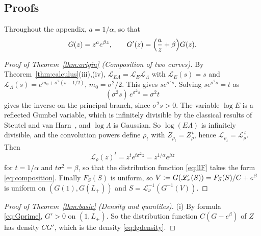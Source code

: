 \documentclass[sn-mathphys-num]{sn-jnl}\newcommand{\SNJNL}{}
\theoremstyle{thmstyleone}
\theoremstyle{thmstyletwo}
\theoremstyle{thmstylethree}
\theoremstyle{thmstyleone}
\providecommand{\Leh}{\mathscr{L}}
\providecommand{\eqdef}{\mathrel{\vcentcolon=}}
\begin{document}
	\clearpage
	\begin{appendices}
		\section{Proofs}\label{app:proofs}
		
		Throughout the appendix,
		$a=1/\alpha$, so that
		\begin{equation}\label{eq:Gprime}
			G(z)=z^{a}e^{\beta z},
			\qquad
			G'(z)=\Bigl(\frac az+\beta\Bigr)G(z).
		\end{equation}
		
		\begin{proof}[Proof of Theorem~\ref{thm:origin} (Composition of two curves)]
			By Theorem~\ref{thm:calculus}(iii),(iv),
			$\Leh_{E\Lambda}=\Leh_E\Leh_\Lambda$ with $\Leh_E(s)=s$ and
			$\Leh_\Lambda(s)=e^{m_0+\sigma^{2}(s-1/2)}$, $m_0=\sigma^{2}/2$.
			This gives $se^{\sigma^{2}s}$. Solving $se^{\sigma^{2}s}=t$ as
			\begin{equation}\label{eq:lambertsolve}
				(\sigma^{2}s)\,e^{\sigma^{2}s}=\sigma^{2}t
			\end{equation}
			gives the inverse on the principal branch, since $\sigma^{2}s>0$.
			The variable $\log E$ is a reflected Gumbel variable, which is
			infinitely divisible by the classical results of Steutel and van
			Harn~\cite{steutel2004}, and $\log\Lambda$ is
			Gaussian. So $\log(E\Lambda)$ is infinitely divisible, and the
			convolution powers define $\rho_t$ with $Z_{\rho_t}=Z_\rho^{\,t}$,
			hence $\Leh_{\rho_t}=\Leh_\rho^{\,t}$. Then
			\begin{equation}\label{eq:Gpower}
				\Leh_\rho(z)^{t}=z^{t}e^{t\sigma^{2}z}=z^{1/\alpha}e^{\beta z}
			\end{equation}
			for $t=1/\alpha$ and $t\sigma^{2}=\beta$, so that the distribution
			function \eqref{eq:llF} takes the form \eqref{eq:composition}. Finally $F_S(S)$ is uniform, so
			$V\eqdef G(\Leh_\nu(S))=F_S(S)/C+e^{\beta}$ is uniform on
			$(G(1),G(L_+))$ and $S=\Leh_\nu^{-1}(G^{-1}(V))$.
		\end{proof}
		
		\begin{proof}[Proof of Theorem~\ref{thm:basic} (Density and quantiles)]\leavevmode
			
			\noindent(i) By formula \eqref{eq:Gprime}, $G'>0$ on $(1,L_+)$. So the distribution
			function $C(G-e^{\beta})$ of $Z$ has density $CG'$, which is
			the density \eqref{eq:lgdensity}.
			

\end{proof}
\end{appendices}
\end{document}
